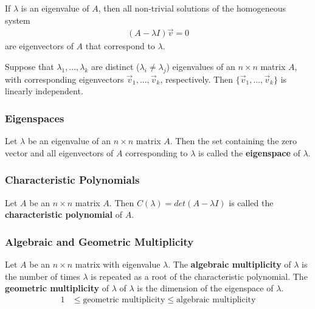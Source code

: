 \documentclass[a4paper,9pt]{extarticle}
\begin{document}
\begin{multicols*}{2}
If $\lambda$ is an eigenvalue of $A$, then all non-trivial solutions of the homogeneous system
\begin{equation} \label{6.1-2}
    \begin{split}
        (A - \lambda I) \vec{v} = 0
    \end{split}
\end{equation}
are eigenvectors of $A$ that correspond to $\lambda$.

Suppose that $\lambda_1, ..., \lambda_k$ are distinct ($\lambda_i \neq \lambda_j$) eigenvalues of an $n \times n$ matrix $A$, with corresponding eigenvectors $\vec{v}_1, ..., \vec{v}_k$, respectively. Then $\{\vec{v}_1, ..., \vec{v}_k\}$ is linearly independent.


\subsubsection{Eigenspaces}
Let $\lambda$ be an eigenvalue of an $n \times n$ matrix $A$. Then the set containing the zero vector and all eigenvectors of $A$ corresponding to $\lambda$ is called the \textbf{eigenspace} of $\lambda$.


\subsubsection{Characteristic Polynomials}
Let $A$ be an $n \times n$ matrix $A$. Then $C(\lambda) = det(A - \lambda I)$ is called the \textbf{characteristic polynomial} of $A$.


\subsubsection{Algebraic and Geometric Multiplicity}
Let $A$ be an $n \times n$ matrix with eigenvalue $\lambda$. The \textbf{algebraic multiplicity} of $\lambda$ is the number of times $\lambda$ is repeated as a root of the characteristic polynomial. The \textbf{geometric multiplicity} of $\lambda$ of $\lambda$ is the dimension of the eigenspace of $\lambda$.
\begin{equation} \label{6.1-3}
    \begin{split}
        1 & \leq \textrm{geometric multiplicity} \leq \textrm{algebraic multiplicity}
    \end{split}
\end{equation}


\end{multicols*}
\end{document}
